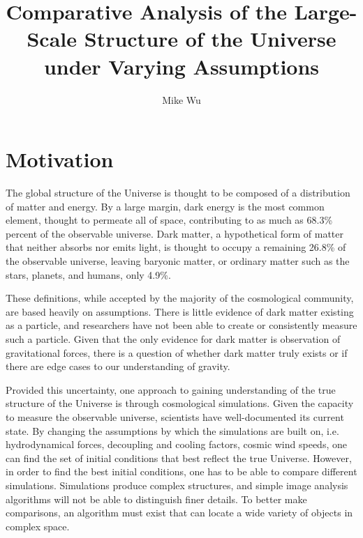 \documentclass[12pt]{article}
\begin{document}
\title{Comparative Analysis of the Large-Scale Structure of the Universe under Varying Assumptions}
\author{Mike Wu}

\maketitle
\section{Motivation}
The global structure of the Universe is thought to be composed of a distribution of matter and energy. By a large margin, dark energy is the most common element, thought to permeate all of space, contributing to as much as 68.3\% percent of the observable universe. Dark matter, a hypothetical form of matter that neither absorbs nor emits light, is thought to occupy a remaining 26.8\% of the observable universe, leaving baryonic matter, or ordinary matter such as the stars, planets, and humans, only 4.9\%. 

These definitions, while accepted by the majority of the cosmological community, are based heavily on assumptions. There is little evidence of dark matter existing as a particle, and researchers have not been able to create or consistently measure such a particle. Given that the only evidence for dark matter is observation of gravitational forces, there is a question of whether dark matter truly exists or if there are edge cases to our understanding of gravity.

Provided this uncertainty, one approach to gaining understanding of the true structure of the Universe is through cosmological simulations. Given the capacity to measure the observable universe, scientists have well-documented its current state. By changing the assumptions by which the simulations are built on, i.e. hydrodynamical forces, decoupling and cooling factors, cosmic wind speeds, one can find the set of initial conditions that best reflect the true Universe. However, in order to find the best initial conditions, one has to be able to compare different simulations. Simulations produce complex structures, and simple image analysis algorithms will not be able to distinguish finer details. To better make comparisons, an algorithm must exist that can locate a wide variety of objects in complex space.
\end{document}
